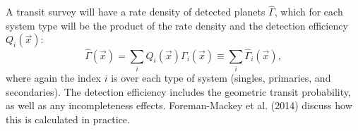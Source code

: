 A transit survey will have a rate density of detected planets $\hat{\Gamma}$, 
which for each system type will be the product of the rate density and the 
detection efficiency $Q_i(\vec{x})$:
\begin{equation}
\hat{\Gamma}(\vec{x}) = \sum_i Q_i(\vec{x}) \Gamma_i(\vec{x}) 
\equiv \sum_i \hat{\Gamma}_i(\vec{x}),
\label{eq:detected_rate_density}
\end{equation}
where again the index $i$ is over each type of system (singles, primaries, 
and secondaries).
The detection efficiency includes the geometric transit probability, as well 
as any incompleteness effects.
Foreman-Mackey et al. (2014) discuss how this 
is calculated in practice.

